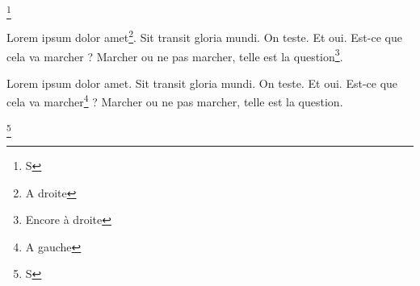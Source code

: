 \documentclass[twoside]{book}
\begin{document}
\footnote{S}
\begin{pages}


\begin{Rightside}
\beginnumbering
\pstart
Lorem ipsum dolor amet\footnote{\label{droite}A droite}. Sit transit gloria mundi.
On teste. Et oui. Est-ce que cela va marcher ? Marcher ou ne pas marcher, telle est la question\footnote{\label{droiteencore}Encore à droite}.
\pend
\endnumbering
\end{Rightside}

\begin{Leftside}
\beginnumbering
\pstart
Lorem ipsum dolor amet. Sit transit gloria mundi.
On teste. Et oui. Est-ce que cela va marcher\footnote{\label{gauche}A gauche} ? Marcher ou ne pas marcher, telle est la question.
\pend
\endnumbering
\end{Leftside}
\end{pages}

\Pages
\footnote{S}
\end{document}
